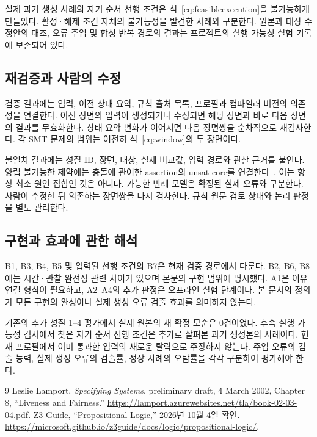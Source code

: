\documentclass[11pt,a4paper]{article}
\begin{document}
실제 과거 생성 사례의 자기 순서 선행 조건은
식~\eqref{eq:feasibleexecution}을 불가능하게 만들었다.
활성·해제 조건 자체의 불가능성을 발견한 사례와 구분한다.
원본과 대상 수정안의 대조, 오류 주입 및 합성 반복 경로의 결과는
프로젝트의 실행 가능성 실험 기록에 보존되어 있다.

\subsection{재검증과 사람의 수정}
검증 결과에는 입력, 이전 상태 요약, 규칙 출처 목록,
프로필과 컴파일러 버전의 의존성을 연결한다.
이전 장면의 입력이 생성되거나 수정되면 해당 장면과 바로 다음 장면의 결과를 무효화한다.
상태 요약 변화가 이어지면 다음 장면쌍을 순차적으로 재검사한다.
각 SMT 문제의 범위는 여전히 식~\eqref{eq:window}의 두 장면이다.

불일치 결과에는 성질 ID, 장면, 대상, 실제 비교값,
입력 경로와 관찰 근거를 붙인다.
양립 불가능한 제약에는 충돌에 관여한 assertion의 unsat core를 연결한다~\cite{z3guide}.
이는 항상 최소 원인 집합인 것은 아니다.
가능한 반례 모델은 확정된 실제 오류와 구분한다.
사람이 수정한 뒤 의존하는 장면쌍을 다시 검사한다.
규칙 원문 검토 상태와 논리 판정을 별도 관리한다.

\subsection{구현과 효과에 관한 해석}
B1, B3, B4, B5 및 입력된 선행 조건의 B7은 현재 검증 경로에서 다룬다.
B2, B6, B8에는 시간·관찰 완전성 관련 차이가 있으며 본문의 구현 범위에 명시했다.
A1은 이유 연결 형식이 필요하고, A2--A4의 추가 판정은 오프라인 실험 단계이다.
본 문서의 정의가 모든 구현의 완성이나 실제 생성 오류 검출 효과를 의미하지 않는다.

기존의 추가 성질 1--4 평가에서 실제 원본의 새 확정 모순은 0건이었다.
후속 실행 가능성 검사에서 찾은 자기 순서 선행 조건은 추가로 살펴본 과거 생성본의 사례이다.
현재 프로필에서 이미 통과한 입력의 새로운 탈락으로 주장하지 않는다.
주입 오류의 검출 능력, 실제 생성 오류의 검출률,
정상 사례의 오탐률을 각각 구분하여 평가해야 한다.

\begin{thebibliography}{9}
Leslie Lamport, \emph{Specifying Systems}, preliminary draft, 4 March 2002,
Chapter 8, ``Liveness and Fairness.''
\url{https://lamport.azurewebsites.net/tla/book-02-03-04.pdf}.
Z3 Guide, ``Propositional Logic,'' 2026년 10월 4일 확인.
\url{https://microsoft.github.io/z3guide/docs/logic/propositional-logic/}.
\end{thebibliography}
\end{document}
